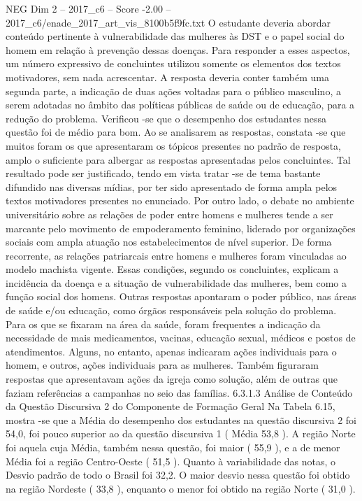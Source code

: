 \begin{textsample}{NEG Dim 2 – 2017\_c6 – Score -2.00 – 2017\_c6/enade\_2017\_art\_vis\_8100b5f9fc.txt}
O estudante deveria abordar conteúdo pertinente à vulnerabilidade das mulheres às DST e o papel social do homem em relação à prevenção dessas doenças.
Para responder a esses aspectos, um número expressivo de concluintes utilizou somente os elementos dos textos motivadores, sem nada acrescentar.
A resposta deveria conter também uma segunda parte, a indicação de duas ações voltadas para o público masculino, a serem adotadas no âmbito das políticas públicas de saúde ou de educação, para a redução do problema.
Verificou -se que o desempenho dos estudantes nessa questão foi de médio para bom.
Ao se analisarem as respostas, constata -se que muitos foram os que apresentaram os tópicos presentes no padrão de resposta, amplo o suficiente para albergar as respostas apresentadas pelos concluintes.
Tal resultado pode ser justificado, tendo em vista tratar -se de tema bastante difundido nas diversas mídias, por ter sido apresentado de forma ampla pelos textos motivadores presentes no enunciado.
Por outro lado, o debate no ambiente universitário sobre as relações de poder entre homens e mulheres tende a ser marcante pelo movimento de empoderamento feminino, liderado por organizações sociais com ampla atuação nos estabelecimentos de nível superior.
De forma recorrente, as relações patriarcais entre homens e mulheres foram vinculadas ao modelo machista vigente.
Essas condições, segundo os concluintes, explicam a incidência da doença e a situação de vulnerabilidade das mulheres, bem como a função social dos homens.
Outras respostas apontaram o poder público, nas áreas de saúde e/ou educação, como órgãos responsáveis pela solução do problema.
Para os que se fixaram na área da saúde, foram frequentes a indicação da necessidade de mais medicamentos, vacinas, educação sexual, médicos e postos de atendimentos.
Alguns, no entanto, apenas indicaram ações individuais para o homem, e outros, ações individuais para as mulheres.
Também figuraram respostas que apresentavam ações da igreja como solução, além de outras que faziam referências a campanhas no seio das famílias. 6.3.1.3 Análise de Conteúdo da Questão Discursiva 2 do Componente de Formação Geral Na Tabela 6.15, mostra -se que a Média do desempenho dos estudantes na questão discursiva 2 foi 54,0, foi pouco superior ao da questão discursiva 1 ( Média 53,8 ).
A região Norte foi aquela cuja Média, também nessa questão, foi maior ( 55,9 ), e a de menor Média foi a região Centro-Oeste ( 51,5 ).
Quanto à variabilidade das notas, o Desvio padrão de todo o Brasil foi 32,2.
O maior desvio nessa questão foi obtido na região Nordeste ( 33,8 ), enquanto o menor foi obtido na região Norte ( 31,0 ).

\end{textsample}
